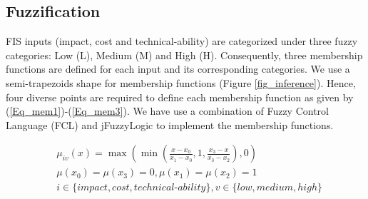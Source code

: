 \subsection{Fuzzification}
\label{pas_prior_fuzz}

FIS inputs (impact, cost and technical-ability) are categorized under three fuzzy categories: Low (L), Medium (M) and High (H). Consequently, three membership functions are defined for each input and its corresponding categories. We use a semi-trapezoids shape for membership functions (Figure \ref{fig_inference}). Hence, four diverse points are required to define each membership function as given by (\ref{Eq_mem1})-(\ref{Eq_mem3}). We have use a combination of Fuzzy Control Language (FCL) and jFuzzyLogic \cite{lewis1998programming} to implement the membership functions.%


\begin{align}
	\label{Eq_mem1}
	& \mu_{iv}(x) = \max (\min(\frac{x-x_0}{x_1-x_0},1,\frac{x_3-x}{x_3-x_2}),0)\\
    \label{Eq_mem2}
   	& \mu(x_0)=\mu(x_3)=0,\mu(x_1)=\mu(x_2)=1 \\ 
	\label{Eq_mem3}
	& i \in \{impact,cost,technical\text{-}ability\} ,v \in \{low,medium,high\}
\end{align}

